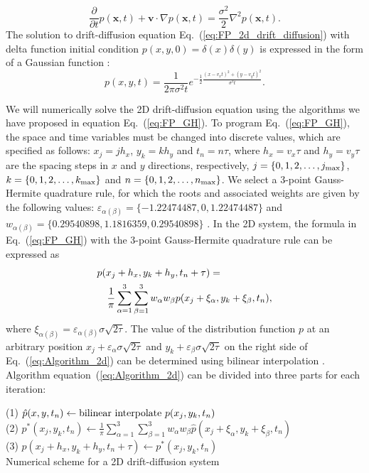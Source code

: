 \documentclass[aps,pre,reprint,superscriptaddress,showpacs,amsmath
,floatfix
]{revtex4-2}
\renewcommand{\vec}[1]{\boldsymbol{#1}}
\newcommand{\eq}[1]{Eq.~(\ref{#1})}
\newcommand{\eqa}[1]{equation~(\ref{#1})}
\begin{document}
\begin{equation}\label{eq:FP_2d_drift_diffusion}
    \frac{\partial }{\partial t} p(\vec{x},t) + \vec{v}\cdot\nabla p(\vec{x},t) = \frac{\sigma^2}{2}\nabla^2 p(\vec{x},t) .
\end{equation} 
The solution to drift-diffusion equation \eq{eq:FP_2d_drift_diffusion} with delta function initial condition $p(x,y,0) = \delta(x)\delta(y)$ is expressed in the form of a Gaussian function \cite{risken1996fokker, frank2005nonlinear}:
\begin{equation}\label{eq:2d_drift_diffusion_sol}
    p(x,y,t) = \frac{1}{2\pi \sigma^2 t} e^{- \frac{1}{2} \frac{(x-v_xt)^2 + (y-v_yt)^2}{\sigma^2 t}} .
\end{equation}

We will numerically solve the 2D drift-diffusion equation using the algorithms we have proposed in equation \eq{eq:FP_GH}. To program \eq{eq:FP_GH}, the space and time variables must be changed into discrete values, which are specified as follows: $x_j = jh_x$, $y_k = kh_y$ and $t_n = n\tau$, where $h_x=v_x\tau$ and $h_y=v_y\tau$ are the spacing steps in $x$ and $y$ directions, respectively, $j = \{0, 1, 2, \dots, j_\textnormal{max}\}$, $k = \{0, 1, 2, \dots, k_\textnormal{max}\}$ and $n = \{0, 1, 2, \dots, n_\textnormal{max}\}$. We select a 3-point Gauss-Hermite quadrature rule, for which the roots and associated weights are given by the following values: $\varepsilon_{\alpha (\beta)} = \{-1.22474487, 0, 1.22474487\}$ and $w_{\alpha (\beta)} = \{0.29540898, 1.1816359, 0.29540898\}$ \cite{abramowitz1972handbook}. In the 2D system, the formula in \eq{eq:FP_GH} with the 3-point Gauss-Hermite quadrature rule can be expressed as
\begin{eqnarray}\label{eq:Algorithm_2d}
\lefteqn{
    p(x_j + h_x, y_k + h_y, t_n + \tau) = 
} \nonumber\\
    &&  \frac{1}{\pi}\sum_{\alpha=1}^3 \sum_{\beta=1}^3 w_{\alpha} w_{\beta} p(x_j + \xi_\alpha, y_k + \xi_\beta, t_n) ,
\end{eqnarray}
where $\xi_{\alpha (\beta)} = \varepsilon_{\alpha (\beta)} \sigma\sqrt{2\tau}$. The value of the distribution function $p$ at an arbitrary position $x_j + \varepsilon_\alpha \sigma\sqrt{2\tau}$ and $y_k + \varepsilon_\beta \sigma\sqrt{2\tau}$  on the right side of \eq{eq:Algorithm_2d} can be determined using bilinear interpolation \cite{NumericalRecipes}. Algorithm \eqa{eq:Algorithm_2d} can be divided into three parts for each iteration:

\begin{algorithm}
(1) $\hat{p}(x, y, t_n) \gets \textnormal{bilinear interpolate} ~p(x_j, y_k, t_n)$ \\
(2) $p^\ast(x_j, y_k, t_n) \gets \frac{1}{\pi}\sum_{\alpha=1}^3 \sum_{\beta=1}^3 w_{\alpha} w_{\beta} \hat{p}(x_j + \xi_\alpha, y_k + \xi_\beta, t_n)$ \\
(3) $p(x_j + h_x, y_k + h_y, t_n + \tau) \gets p^\ast(x_j, y_k, t_n)$ \\

\caption{Numerical scheme for a 2D drift-diffusion system}
\end{algorithm}
\end{document}
